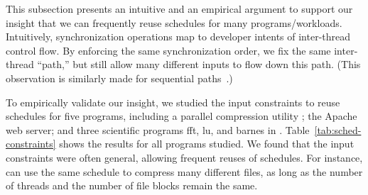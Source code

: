 This subsection presents an intuitive and an empirical argument to support
our insight that we can frequently reuse schedules for many
programs/workloads.  Intuitively, synchronization operations map to developer
intents of inter-thread control flow.  By enforcing the same
synchronization order, we fix the same inter-thread ``path,'' but still
allow many different inputs to flow down this path.  (This observation is
similarly made for sequential
paths~\cite{fisher:branch:asplos92,ball:branch:pldi93,ball:path:micro29}.)

To empirically validate our insight, we studied the input constraints to
reuse schedules for five programs, including a parallel compression
utility \pbzip; the Apache web server; and three scientific programs fft,
lu, and barnes in \splash.  Table~\ref{tab:sched-constraints} shows the
results for all programs studied.  We found that the input constraints
were often general, allowing frequent reuses of schedules.  For instance,
\pbzip can use the same schedule to compress many different files, as long
as the number of threads and the number of file blocks remain the same.



